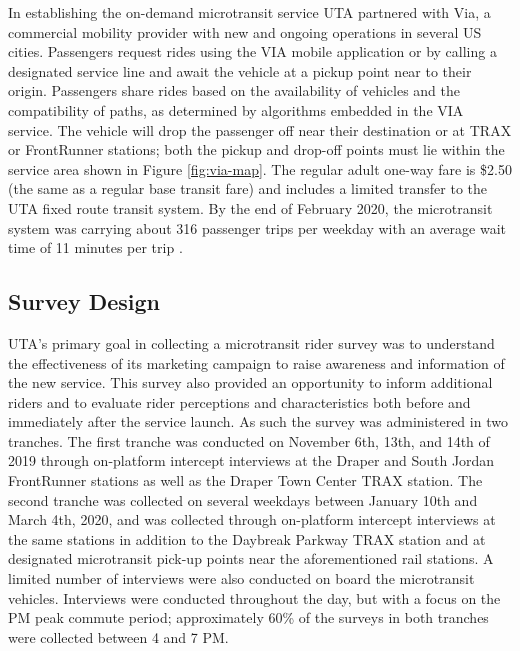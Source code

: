 \documentclass[smartcities,article,submit,moreauthors,pdftex]{mdpi}
\begin{document}
In establishing the on-demand microtransit service UTA partnered with Via, a
commercial mobility provider with new and ongoing operations in several US
cities. Passengers request rides using the VIA mobile application or by calling a
designated service line and await the vehicle at a pickup point near to their
origin. Passengers share rides based on the availability of vehicles and the
compatibility of paths, as determined by algorithms embedded in the VIA service.
The vehicle will drop the passenger off near their destination or at TRAX or
FrontRunner stations; both the pickup and drop-off points must lie within the
service area shown in Figure \ref{fig:via-map}. The regular adult one-way fare
is \$2.50 (the same as a regular base transit fare) and includes a limited
transfer to the UTA fixed route transit system. By the end of February 2020, the
microtransit system was carrying about 316 passenger trips per weekday with an
average wait time of 11 minutes per trip \citep{uta2020}.

\hypertarget{survey-design}{%
\subsection{Survey Design}\label{survey-design}}

UTA's primary goal in collecting a microtransit rider survey was to understand the effectiveness
of its marketing campaign to raise awareness and information of the new service.
This survey also provided an opportunity to inform additional riders and to
evaluate rider perceptions and characteristics both before and immediately after
the service launch. As such the survey was administered in two tranches. The
first tranche was conducted on November 6th, 13th, and 14th of 2019 through
on-platform intercept interviews at the Draper and South Jordan FrontRunner
stations as well as the Draper Town Center TRAX station. The second tranche was
collected on several weekdays between January 10th and March 4th, 2020, and was
collected through on-platform intercept interviews at the same stations in
addition to the Daybreak Parkway TRAX station and at designated microtransit
pick-up points near the aforementioned rail stations. A limited number of
interviews were also conducted on board the microtransit vehicles. Interviews
were conducted throughout the day, but with a focus on the PM peak commute
period; approximately 60\% of the surveys in both tranches were collected between 4 and 7 PM.
\end{document}
